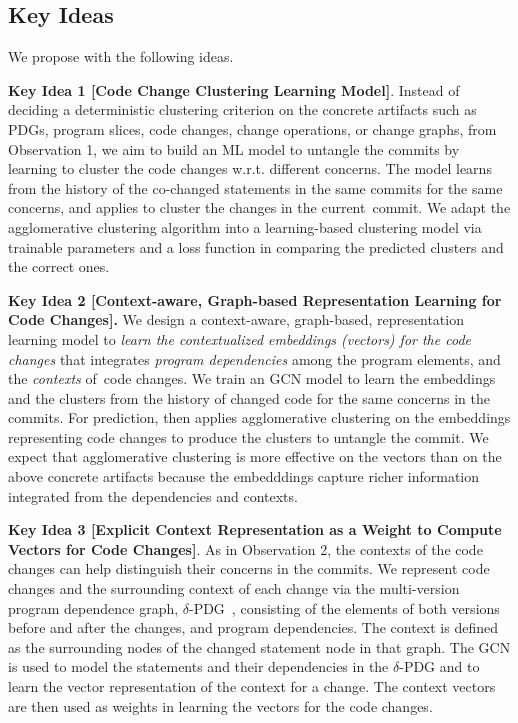 \subsection{Key Ideas}
\label{ideas:sec}

We propose {\tool} with the following ideas.


{\bf Key Idea 1 [Code Change Clustering Learning Model]}. Instead of
deciding a deterministic clustering criterion on the concrete
artifacts such as PDGs, program slices, code changes, change
operations, or change graphs, from Observation 1, we aim to build an
ML model to untangle the commits by learning to cluster the code
changes w.r.t. different concerns. The model learns from the
history of the co-changed statements in the same commits for the same
concerns, and applies to cluster the changes in the current~commit.
We adapt the agglomerative clustering algorithm into a
learning-based clustering model via trainable parameters and a loss
function in comparing the predicted clusters and the correct ones.

{\bf Key Idea 2 [Context-aware, Graph-based Representation Learning
    for Code Changes].} We design a context-aware, graph-based,
representation learning model to {\em learn the contextualized
  embeddings (vectors) for the code changes} that integrates {\em
  program dependencies} among the program elements, and the {\em
  contexts} of~code changes. We train an GCN model to learn the
embeddings and the clusters from the history of changed code for the
same concerns in the commits. For prediction, {\tool} then applies
agglomerative clustering on the embeddings representing code changes
to produce the clusters to untangle the commit. We expect that
agglomerative clustering is more effective on the vectors than on
the above concrete artifacts because the embedddings capture richer
information integrated from the dependencies and contexts.


{\bf Key Idea 3 [Explicit Context Representation as a Weight to
    Compute Vectors for Code Changes]}. As in Observation 2, the
contexts of the code changes can help distinguish their
concerns in the commits. We represent code changes and the
surrounding context of each change via the multi-version program
dependence graph, $\delta$-PDG~\cite{flexeme-fse20}, consisting of the
elements of both versions before and after the changes, and 
program dependencies. The context is defined as the surrounding nodes
of the changed statement node in that graph. The GCN is used to
model the statements and their dependencies in the $\delta$-PDG and to
learn the vector representation of the context for a change. The
context vectors are then used as weights in learning the vectors for the
code changes.

